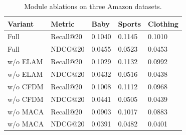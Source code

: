 \begin{table}[t]
\centering
\caption{Module ablations on three Amazon datasets.}
\begin{tabular}{lllll}
\toprule
Variant & Metric & Baby & Sports & Clothing \\
\midrule
Full & Recall@20 & 0.1040 & 0.1145 & 0.1010 \\
Full & NDCG@20 & 0.0455 & 0.0523 & 0.0453 \\
w/o ELAM & Recall@20 & 0.1029 & 0.1132 & 0.0992 \\
w/o ELAM & NDCG@20 & 0.0432 & 0.0516 & 0.0438 \\
w/o CFDM & Recall@20 & 0.1008 & 0.1112 & 0.0968 \\
w/o CFDM & NDCG@20 & 0.0441 & 0.0505 & 0.0439 \\
w/o MACA & Recall@20 & 0.0903 & 0.1017 & 0.0883 \\
w/o MACA & NDCG@20 & 0.0391 & 0.0482 & 0.0401 \\
\bottomrule
\end{tabular}
\end{table}
